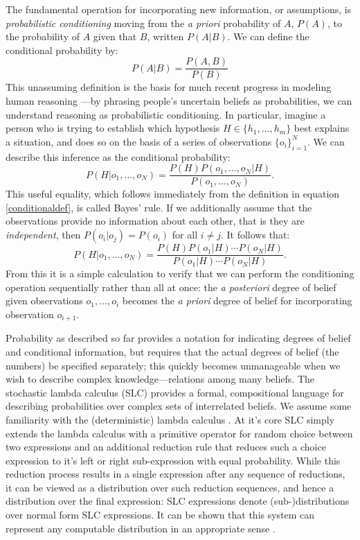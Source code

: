 \documentclass[12pt]{article}
\newcounter{definition}
\begin{document}
The fundamental operation for incorporating new information, or assumptions, is \emph{probabilistic conditioning} moving from the \emph{a priori} probability of $A$, $P(A)$, to the probability of $A$ given that $B$, written $P(A|B)$. We can define the conditional probability by:
\begin{equation}
\label{conditionaldef}
P(A|B) = \frac{P(A,B)}{P(B)} 
\end{equation}
This unassuming definition is the basis for much recent progress in modeling human reasoning \cite[e.g.][]{tenenbaum2011}---by phrasing people's uncertain beliefs as probabilities, we can understand reasoning as probabilistic conditioning. In particular, imagine a person who is trying to establish which hypothesis $H\in\{h_1,\dots,h_m\}$ best explains a situation, and does so on the basis of a series of observations $\{o_i\}_{i=1}^N$. We can describe this inference as the conditional probability:
\begin{equation}
P(H|o_1,\dots,o_N) = \frac{P(H)P(o_1,\dots,o_N|H)}{P(o_1,\dots,o_N)}.
\end{equation}
This useful equality, which follows immediately from the definition in equation \ref{conditionaldef}, is called Bayes' rule. If we additionally assume that the observations provide no information about each other, that is they are \emph{independent}, then $P(o_i|o_j)=P(o_i)$ for all $i\neq j$. It follows that:
\begin{equation}
P(H|o_1,\dots,o_N) = \frac{P(H)P(o_1|H)\cdots P(o_N|H)}{P(o_1|H)\cdots P(o_N|H)}.
\end{equation}
From this it is a simple calculation to verify that we can perform the conditioning operation sequentially rather than all at once: the \emph{a posteriori} degree of belief given observations $o_1,\dots,o_i$ becomes the \emph{a priori} degree of belief for incorporating observation $o_{i+1}$.

Probability as described so far provides a notation for indicating degrees of belief and conditional information, but requires that the actual degrees of belief (the numbers) be specified separately; this quickly becomes unmanageable when we wish to describe complex knowledge---relations among many beliefs. The stochastic lambda calculus (SLC) provides a formal, compositional language for describing probabilities over complex sets of interrelated beliefs. We assume some familiarity with the (deterministic) lambda calculus \cite{lambda}. At it's core SLC simply extends the lambda calculus with a primitive operator for random choice between two expressions and an additional reduction rule that reduces such a choice expression to it's left or right sub-expression with equal probability. While this reduction process results in a single expression after any sequence of reductions, it can be viewed as a distribution over such reduction sequences, and hence a distribution over the final expression: SLC expressions denote (sub-)distributions over normal form SLC expressions. It can be shown that this system can represent any computable distribution in an appropriate sense \cite[see for example][]{PfefferRamsey,FreeRoy}.
\end{document}
